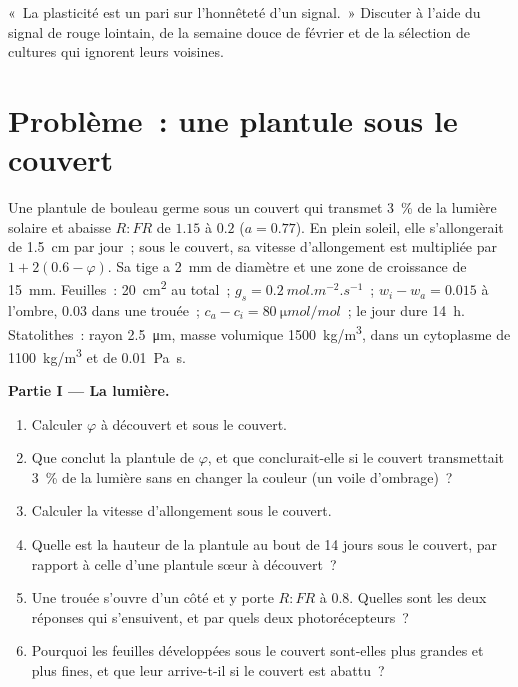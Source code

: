 \begin{exercise}[$\star\star\star$]\label{exo:b2:plant-plasticity:12}
«~La plasticité est un pari sur l'honnêteté d'un signal.~» Discuter à
l'aide du signal de rouge lointain, de la semaine douce de février et de
la sélection de cultures qui ignorent leurs voisines.
\end{exercise}

\section{Problème~: une plantule sous le couvert}

\begin{problem}
\label{pb:b2:plant-plasticity:1}
Une plantule de bouleau germe sous un couvert qui transmet \qty{3}{\%}
de la lumière solaire et abaisse $R{:}FR$ de $1.15$ à $0.2$
($a = 0.77$). En plein soleil, elle s'allongerait de \qty{1.5}{cm} par
jour~; sous le couvert, sa vitesse d'allongement est multipliée par
$1 +
2(0.6 - \varphi)$. Sa tige a \qty{2}{mm} de diamètre et une zone de
croissance de \qty{15}{mm}. Feuilles~: \qty{20}{cm^2} au total~; $g_s =
\qty{0.2}{mol.m^{-2}.s^{-1}}$~; $w_i - w_a = 0.015$ à l'ombre, $0.03$
dans une trouée~; $c_a - c_i = \qty{80}{\micro mol/mol}$~; le jour dure
\qty{14}{h}. Statolithes~: rayon \qty{2.5}{\micro m}, masse volumique
\qty{1500}{kg/m^3}, dans un cytoplasme de \qty{1100}{kg/m^3} et de
\qty{0.01}{Pa.s}.

\medskip
\noindent\textbf{Partie I --- La lumière.}
\begin{enumerate}
  \item Calculer $\varphi$ à découvert et sous le couvert.
  \item Que conclut la plantule de $\varphi$, et que conclurait-elle si le couvert
        transmettait \qty{3}{\%} de la lumière sans en changer la couleur
        (un voile d'ombrage)~?
  \item Calculer la vitesse d'allongement sous le couvert.
  \item Quelle est la hauteur de la plantule au bout de 14 jours sous le
        couvert, par rapport à celle d'une plantule sœur à découvert~?
  \item Une trouée s'ouvre d'un côté et y porte $R{:}FR$ à $0.8$. Quelles
        sont les deux réponses qui s'ensuivent, et par quels deux
        photorécepteurs~?
  \item Pourquoi les feuilles développées sous le couvert sont-elles plus
        grandes et plus fines, et que leur arrive-t-il si le couvert est
        abattu~?
\end{enumerate}


\end{problem}
